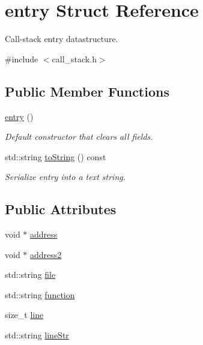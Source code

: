 \hypertarget{structstacktrace_1_1entry}{}\section{entry Struct Reference}
\label{structstacktrace_1_1entry}


Call-\/stack entry datastructure.  




{\ttfamily \#include $<$call\+\_\+stack.\+h$>$}

\subsection*{Public Member Functions}
\begin{DoxyCompactItemize}
\item 
\mbox{\hyperlink{structstacktrace_1_1entry_a59990719363a79bbd250a392185b8e75}{entry}} ()
\begin{DoxyCompactList}\small\item\em Default constructor that clears all fields. \end{DoxyCompactList}\item 
std\+::string \mbox{\hyperlink{structstacktrace_1_1entry_a1fe5121d6528fdea3f243321b3fa3a49}{to\+String}} () const
\begin{DoxyCompactList}\small\item\em Serialize entry into a text string. \end{DoxyCompactList}\end{DoxyCompactItemize}
\subsection*{Public Attributes}
\begin{DoxyCompactItemize}
\item 
void $\ast$ \mbox{\hyperlink{structstacktrace_1_1entry_ab96816d317aa5196e2ef198d9a8d621b}{address}}
\item 
void $\ast$ \mbox{\hyperlink{structstacktrace_1_1entry_ae212b77c2997320c14de82a65d4af735}{address2}}
\item 
std\+::string \mbox{\hyperlink{structstacktrace_1_1entry_aefc35c7944eed319c89bc1b399f0eb67}{file}}
\item 
std\+::string \mbox{\hyperlink{structstacktrace_1_1entry_adf44acd4aa201051e648ac3c09c2e20f}{function}}
\item 
size\+\_\+t \mbox{\hyperlink{structstacktrace_1_1entry_a178448bb4d6d83c01610fec5d40f7c5c}{line}}
\item 
std\+::string \mbox{\hyperlink{structstacktrace_1_1entry_a8bd970c62f0d156a81e10b5d12bdd0fe}{line\+Str}}
\end{DoxyCompactItemize}


